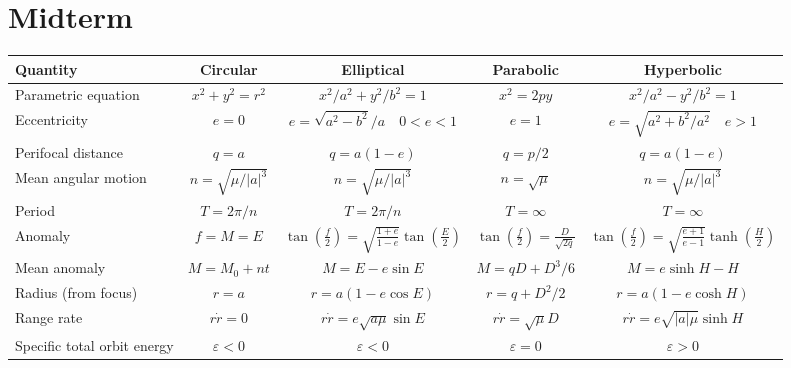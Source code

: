 \documentclass[twocolumn]{article}    %
\begin{document}
\section*{Midterm}
\RaggedRight
\footnotesize 
\setlength{\tabcolsep}{11pt}
\begin{table}[b]
    \centering
    \footnotesize
    \begin{tabular}{lcccc}
        \toprule
        \textbf{Quantity} & \textbf{Circular} & \textbf{Elliptical} & \textbf{Parabolic} & \textbf{Hyperbolic} \\
        \midrule
        Parametric equation & \(x^2 + y^2 = r^2\) & \(x^2/a^2 + y^2/b^2 =1\) & \(x^2 = 2py\) & \(x^2/a^2 - y^2/b^2 =1\)\\
        Eccentricity & \(e=0\) & \(e = \sqrt{a^2-b^2}/a \quad 0<e<1\)& \(e= 1\) &  \(e=\sqrt{a^2+b^2/a^2} \quad e>1\) \\
        Perifocal distance & \(q=a\) &  \(q=a(1-e)\) & \(q=p/2\) &\(q=a(1-e)\)\\
        Mean angular motion & \(n = \sqrt{\mu/|a|^3}\) & \(n = \sqrt{\mu/|a|^3}\) & \(n=\sqrt{\mu}\) &\(n = \sqrt{\mu/|a|^3}\)\\
        Period & \(T=2\pi/n\) & \(T=2\pi/n\) & \(T=\infty\) & \(T=\infty\)\\
        Anomaly & \(f = M = E\) & \(\tan\left(\frac{f}{2}\right) = \sqrt{\frac{1+e}{1-e}}\tan\left(\frac{E}{2} \right)\) & \(\tan\left(\frac{f}{2} \right) =\frac{D}{\sqrt{2q}}\) & \(\tan\left(\frac{f}{2}\right) = \sqrt{\frac{e+1}{e-1}} \tanh\left(\frac{H}{2} \right)\)\\
        Mean anomaly & \(M = M_0 + nt\) & \(M = E-e\sin E\) & \(M = qD + D^3/6\) & \(M = e\sinh H - H\)\\
        Radius (from focus) & \(r=a\) & \(r = a(1-e\cos E)\) & \(r=q + D^2/2\) & \(r = a(1-e\cosh H)\)\\
        Range rate & \(r\dot{r} = 0\) & \(r\dot{r} = e\sqrt{a\mu} \sin E\) & \(r\dot{r} = \sqrt{\mu}D\) & \(r\dot{r} = e\sqrt{|a|\mu}\sinh H\)\\
        Specific total orbit energy & \(\varepsilon<0\) & \(\varepsilon<0\) & \(\varepsilon=0\) & \(\varepsilon >0\) \\
        \bottomrule
    \end{tabular}
\end{table}
\end{document}

